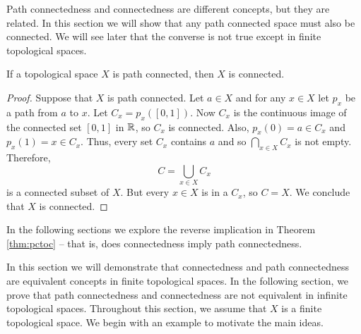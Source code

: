 
Path connectedness and connectedness are different concepts, but they are related. In this section we will show that any path connected space must also be connected. We will see later that the converse is not true except in finite topological spaces. 

\begin{theorem} \label{thm:pctoc} If a topological space $X$ is path connected, then $X$ is connected.
\end{theorem}
 
\begin{proof} Suppose that $X$ is path connected. Let $a \in X$ and for any $x \in X$ let $p_x$ be a path from $a$ to $x$. Let $C_x = p_x([0,1])$. Now $C_x$ is the continuous image of the connected set $[0,1]$ in $\mathbb{R}$, so $C_x$ is connected. Also, $p_x(0) = a \in C_x$ and $p_x(1) = x \in C_x$. Thus, every set $C_x$ contains $a$ and so $\bigcap_{x \in X} C_x$ is not empty. Therefore, 
\[C = \bigcup_{x \in X} C_x\]
is a connected subset of $X$. But every $x \in X$ is in a $C_x$, so $C = X$. We conclude that $X$ is connected. 
\end{proof}

In the following sections we explore the reverse implication in Theorem \ref{thm:pctoc} -- that is, does connectedness imply path connectedness. 


In this section we will demonstrate that connectedness and path connectedness are equivalent concepts in finite topological spaces. In the following section, we prove that path connectedness and connectedness are not equivalent in infinite topological spaces. Throughout this section, we assume that $X$ is a finite topological space. We begin with an example to motivate the main ideas. 

